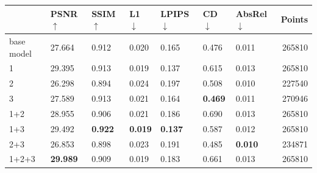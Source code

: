\documentclass[varwidth]{standalone}
\begin{document}
\small
\setlength{\tabcolsep}{4pt}
\begin{tabular}{lllllllr}
\toprule
 & PSNR $\uparrow$ & SSIM $\uparrow$ & L1 $\downarrow$ & LPIPS $\downarrow$ & CD $\downarrow$ & AbsRel $\downarrow$ & Points \\
\midrule
base model & 27.664 & 0.912 & 0.020 & 0.165 & 0.476 & 0.011 & 265810 \\
1 & 29.395 & 0.913 & 0.019 & 0.137 & 0.615 & 0.013 & 265810 \\
2 & 26.298 & 0.894 & 0.024 & 0.197 & 0.508 & 0.010 & 227540 \\
3 & 27.589 & 0.913 & 0.021 & 0.164 & \textbf{0.469} & 0.011 & 270946 \\
1+2 & 28.955 & 0.906 & 0.021 & 0.186 & 0.690 & 0.013 & 265810 \\
1+3 & 29.492 & \textbf{0.922} & \textbf{0.019} & \textbf{0.137} & 0.587 & 0.012 & 265810 \\
2+3 & 26.853 & 0.898 & 0.023 & 0.191 & 0.485 & \textbf{0.010} & 234871 \\
1+2+3 & \textbf{29.989} & 0.909 & 0.019 & 0.183 & 0.661 & 0.013 & 265810 \\
\bottomrule
\end{tabular}
\end{document}
